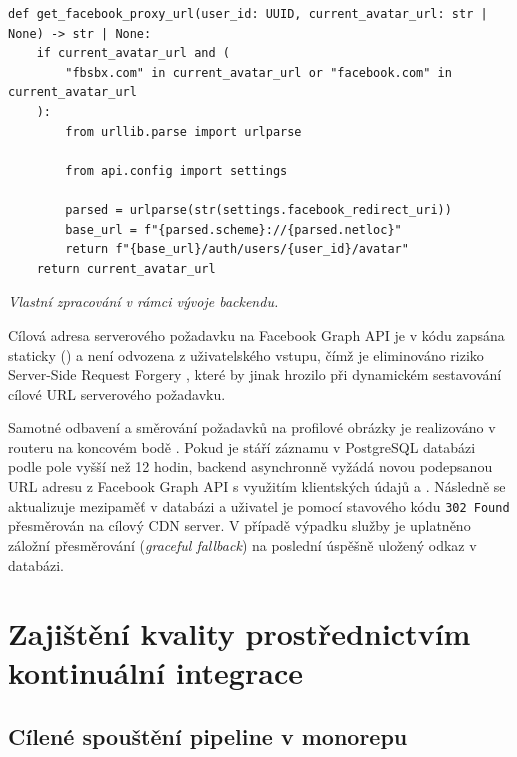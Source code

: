 \documentclass[male,czech,api_bc]{kitheses}
\newcommand{\zdroj}[1]{%
    \vspace{1ex}%
    {\footnotesize \raggedright \textit{#1}\par}%
}
\begin{document}
\begin{listing}[htbp]
\begin{verbatim}
def get_facebook_proxy_url(user_id: UUID, current_avatar_url: str | None) -> str | None:
    if current_avatar_url and (
        "fbsbx.com" in current_avatar_url or "facebook.com" in current_avatar_url
    ):
        from urllib.parse import urlparse

        from api.config import settings

        parsed = urlparse(str(settings.facebook_redirect_uri))
        base_url = f"{parsed.scheme}://{parsed.netloc}"
        return f"{base_url}/auth/users/{user_id}/avatar"
    return current_avatar_url
\end{verbatim}
\caption{Pomocná funkce pro přepisování Facebook URL na lokální proxy}
\label{lst:pydantic_avatar_proxy}
\zdroj{Vlastní zpracování v rámci vývoje backendu.}
\end{listing}

Cílová adresa serverového požadavku na Facebook Graph API je v kódu zapsána staticky () a není odvozena z uživatelského vstupu, čímž je eliminováno riziko Server-Side Request Forgery \cite{Yalon2023API7}, které by jinak hrozilo při dynamickém sestavování cílové URL serverového požadavku.

Samotné odbavení a směrování požadavků na profilové obrázky je realizováno v routeru  na koncovém bodě . Pokud je stáří záznamu v PostgreSQL databázi podle pole  vyšší než 12 hodin, backend asynchronně vyžádá novou podepsanou URL adresu z Facebook Graph API s využitím klientských údajů  a . Následně se aktualizuje mezipaměť v databázi a uživatel je pomocí stavového kódu \texttt{302 Found} přesměrován na cílový CDN server. V případě výpadku služby je uplatněno záložní přesměrování (\textit{graceful fallback}) na poslední úspěšně uložený odkaz v databázi.

\section{Zajištění kvality prostřednictvím kontinuální integrace}
\label{sec:qa_ci}

\subsection{Cílené spouštění pipeline v monorepu}
\end{document}
